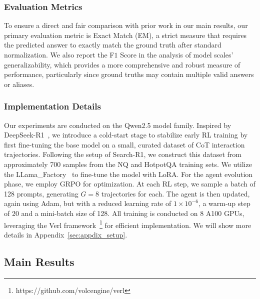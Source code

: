 \subsubsection{Evaluation Metrics}

To ensure a direct and fair comparison with prior work in our main results, our primary evaluation metric is Exact Match (EM), a strict measure that requires the predicted answer to exactly match the ground truth after standard normalization. We also report the F$1$ Score in the analysis of model scales' generalizability, which provides a more comprehensive and robust measure of performance, particularly since ground truths may contain multiple valid answers or aliases.

\subsubsection{Implementation Details}


Our experiments are conducted on the Qwen2.5 model family. Inspired by DeepSeek-R1~\citep{guo2025deepseek}, we introduce a cold-start stage to stabilize early RL training by first fine-tuning the base model on a small, curated dataset of CoT interaction trajectories. Following the setup of Search-R1, we construct this dataset from approximately 700 samples from the NQ and HotpotQA training sets. 
We utilize the LLama\_Factory~\citep{zheng2024llamafactory} to fine-tune the model with LoRA. For the agent evolution phase, we employ GRPO for optimization. At each RL step, we sample a batch of 128 prompts, generating $G=8$ trajectories for each. The agent is then updated, again using Adam, but with a reduced learning rate of $1 \times 10^{-6}$, a warm-up step of 20 and a mini-batch size of 128. All training is conducted on 8 A100 GPUs, leveraging the Verl framework~\footnote{https://github.com/volcengine/verl} for efficient implementation. We will show more details in Appendix~\ref{sec:appdix_setup}. 


\subsection{Main Results}
\label{sec:main_results}

